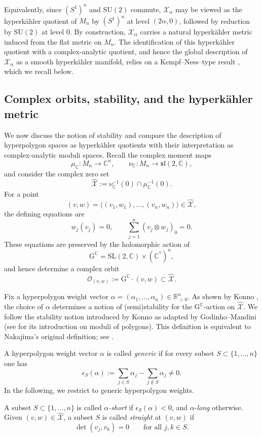 \documentclass[12pt,a4paper]{amsart}
\theoremstyle{definition}
\theoremstyle{remark}
\newcommand{\R}{\mathbb R}
\newcommand{\C}{\mathbb C}
\begin{document}
Equivalently, since $(S^1)^n$ and $\mathrm{SU}(2)$ commute,
$\mathcal X_\alpha$ may be viewed as the hyperk\"ahler quotient of $M_n$ by
$(S^1)^n$ at level $(2\alpha,0)$, followed by reduction by
$\mathrm{SU}(2)$ at level $0$.
By construction, $\mathcal X_\alpha$ carries a natural hyperk\"ahler metric induced from the flat metric on $M_n$.
The identification of this hyperk\"ahler quotient with a complex-analytic quotient,
and hence the global description of $\mathcal X_\alpha$ as a smooth hyperk\"ahler
manifold, relies on a Kempf--Ness--type result \cite{HKLR, Kirwan, Konno2}, which we recall below.


\subsection{Complex orbits, stability, and the hyperk\"ahler metric}
We now  discuss the notion of stability and compare the description of 
hyperpolygon spaces as hyperk\"ahler quotients with their interpretation as complex-analytic moduli spaces.
Recall the complex moment maps
\[
\mu_\C\colon M_n\to\C^n,
\qquad
\nu_\C\colon M_n\to\mathfrak{sl}(2,\C),
\]
and consider the complex zero set
\[
\hat{\mathcal X}:=\nu_\C^{-1}(0)\cap\mu_\C^{-1}(0).
\]
For a point
\[
(v,w)=\bigl((v_1,w_1),\dots,(v_n,w_n)\bigr)\in\hat{\mathcal X},
\]
the defining equations are
\[
w_j(v_j)=0,
\qquad
\sum_{j=1}^n (v_j\otimes w_j)_0=0.
\]
These equations are preserved by the holomorphic action of
\[
\mathrm{G}^\C=\mathrm{SL}(2,\C)\times(\C^*)^n,
\]
and hence determine a complex orbit
\[
\mathcal O_{(v,w)}:=\mathrm{G}^\C\cdot(v,w)\subset\hat{\mathcal X}.
\]



Fix a hyperpolygon weight vector $\alpha=(\alpha_1,\dots,\alpha_n)\in\R_{>0}^n$.
As shown by Konno \cite{Konno2}, the choice of $\alpha$ determines a notion of
(semi)stability for the $\mathrm{G}^\C$-action on $\hat{\mathcal X}$. We follow the 
stability notion introduced by Konno as adapted by Godinho--Mandini \cite{GoMa} (see \cite{Klyachko} for its introduction on moduli of polygons). This definition is equivalent to Nakajima's original definition; see \cite{Nak}.


A hyperpolygon weight vector $\alpha$ is called \emph{generic} if for every  subset
$S\subset\{1,\dots,n\}$ one has
\[
\epsilon_{S}(\alpha):=\sum_{j\in S}\alpha_j-\sum_{j\notin S}\alpha_j\neq0.
\]
In the following, we restrict to generic hyperpolygon weights.

A subset $S\subset\{1,\dots,n\}$ is called \emph{$\alpha$-short} if $\epsilon_{S}(\alpha)<0$,
and $\alpha$-\emph{long} otherwise.
Given $(v,w)\in\hat{\mathcal X}$, a subset $S$ is called \emph{straight} at $(v,w)$ if
\[
\det(v_j,v_k)=0\qquad\text{for all }j,k\in S.
\]
\end{document}
